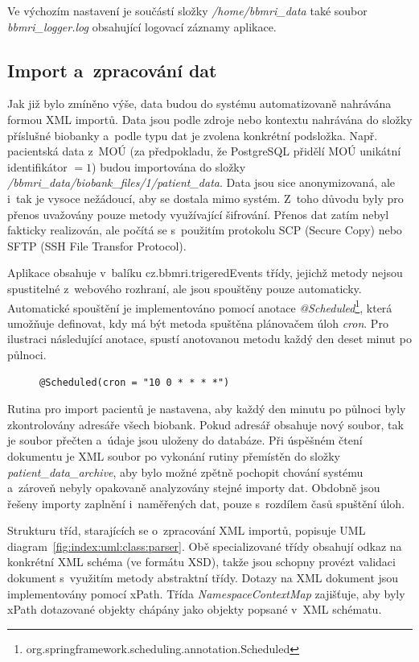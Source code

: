\documentclass[11pt,draft,oneside]{fithesis2}
\begin{document}
Ve výchozím nastavení je součástí složky \textit{/home/bbmri\_data} také soubor \textit{bbmri\_logger.log} obsahující logovací záznamy aplikace. 

\subsection{Import a~zpracování dat}\label{chapter:implementation:subsection:import}
Jak již bylo zmíněno výše, data budou do systému automatizovaně nahrávána formou XML importů. Data jsou podle zdroje nebo kontextu nahrávána do složky příslušné biobanky a~podle typu dat je zvolena konkrétní podsložka. Např. pacientská data z~MOÚ (za předpokladu, že PostgreSQL přidělí MOÚ unikátní identifikátor $= 1$) budou importována do složky \textit{/bbmri\_data/biobank\_files/1/patient\_data}. Data jsou sice anonymizovaná, ale i~tak je vysoce nežádoucí, aby se dostala mimo systém. Z~toho důvodu byly pro přenos uvažovány pouze metody využívající šifrování. Přenos dat zatím nebyl fakticky realizován, ale počítá se s~použitím protokolu SCP (Secure Copy) nebo SFTP (SSH File Transfor Protocol). 

Aplikace obsahuje v~balíku cz.bbmri.trigeredEvents třídy, jejichž metody nejsou spustitelné z~webového rozhraní, ale jsou spouštěny pouze automaticky. Automatické spouštění je implementováno pomocí anotace \textit{@Scheduled}\footnote{org.springframework.scheduling.annotation.Scheduled}, která umožňuje definovat, kdy má být metoda spuštěna plánovačem úloh \textit{cron}. 
Pro ilustraci následující anotace, spustí anotovanou metodu každý den deset minut po půlnoci. 
\begin{figure}[h!]
\centering
\begin{BVerbatim}
@Scheduled(cron = "10 0 * * * *")
\end{BVerbatim}
\end{figure}
Rutina pro import pacientů je nastavena, aby každý den minutu po půlnoci byly zkontrolovány adresáře všech biobank. Pokud adresář obsahuje nový soubor, tak je soubor přečten a~údaje jsou uloženy do databáze. Při úspěšném čtení dokumentu je XML soubor po vykonání rutiny přemístěn do složky \textit{patient\_data\_archive}, aby bylo možné zpětně pochopit chování systému a~zároveň nebyly opakovaně analyzovány stejné importy dat.
Obdobně jsou řešeny importy zaplnění i~naměřených dat, pouze s~rozdílem časů spuštění úloh.

Strukturu tříd, starajících se o~zpracování XML importů, popisuje UML diagram~\ref{fig:index:uml:class:parser}. Obě specializované třídy obsahují odkaz na konkrétní XML schéma (ve formátu XSD), takže jsou schopny provézt validaci dokument s~využitím metody abstraktní třídy. Dotazy na XML dokument jsou implementovány pomocí xPath.
Třída \textit{NamespaceContextMap} zajišťuje, aby byly xPath dotazované objekty chápány jako objekty popsané v~XML schématu.
\end{document}
